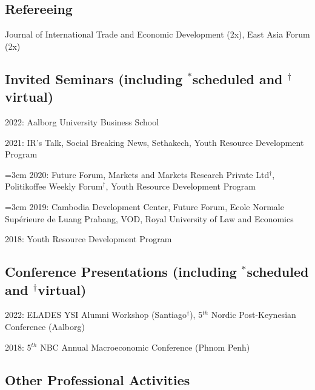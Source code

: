 \documentclass[10pt,a4paper]{article}
\begin{document}
\subsection*{Refereeing}
	
	Journal of International Trade and Economic Development (2x), East Asia Forum (2x)

\subsection*{Invited Seminars (including $^\ast$scheduled and $^\dag$virtual)}

	2022: Aalborg University Business School

	2021: IR’s Talk, Social Breaking News, Sethakech, Youth Resource Development Program
				
\hangindent=3em
	2020: Future Forum, Markets and Markets Research Private Ltd$^\dag$, Politikoffee Weekly Forum$^\dag$, Youth Resource Development Program

\hangindent=3em
	2019: Cambodia Development Center, Future Forum, Ecole Normale Supérieure de Luang Prabang, VOD, Royal University of Law and Economics

	2018: Youth Resource Development Program
	
\subsection*{Conference Presentations (including $^\ast$scheduled and $^\dag$virtual)}


	2022:  ELADES YSI Alumni Workshop (Santiago$^\dag$), 5$^{th}$ Nordic Post-Keynesian Conference (Aalborg)

	2018: 5$^{th}$ NBC Annual Macroeconomic Conference (Phnom Penh)

\subsection*{Other Professional Activities}
\end{document}
